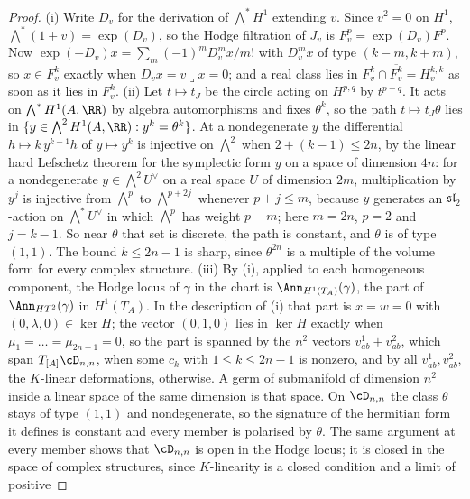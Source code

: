\begin{proof}
(i) Write $D_{v}$ for the derivation of $\bigwedge^{*}H^{1}$ extending $v$.
Since $v^{2}=0$ on $H^{1}$, $\bigwedge^{*}(1+v)=\exp(D_{v})$, so the Hodge
filtration of $J_{v}$ is $F^{p}_{v}=\exp(D_{v})F^{p}$. Now
$\exp(-D_{v})x=\sum_{m}(-1)^{m}D_{v}^{m}x/m!$ with $D_{v}^{m}x$ of type
$(k-m,k+m)$, so $x\in F^{k}_{v}$ exactly when $D_{v}x=v\lrcorner x=0$; and a
real class lies in $F^{k}_{v}\cap\overline{F^{k}_{v}}=H^{k,k}_{v}$ as soon as
it lies in $F^{k}_{v}$. (ii) Let $t\mapsto t_{J}$ be the circle acting on
$H^{p,q}$ by $t^{p-q}$. It acts on $\bigwedge^{*}H^{1}(A,\RR)$ by algebra
automorphisms and fixes $\theta^{k}$, so the path $t\mapsto t_{J}\theta$ lies in
$\{y\in\bigwedge^{2}H^{1}(A,\RR):y^{k}=\theta^{k}\}$. At a nondegenerate $y$
the differential $h\mapsto k\,y^{k-1}h$ of $y\mapsto y^{k}$ is injective on
$\bigwedge^{2}$ when $2+(k-1)\le2n$, by the linear hard Lefschetz theorem for
the symplectic form $y$ on a space of dimension $4n$: for a nondegenerate
$y\in\bigwedge^{2}U^{\vee}$ on a real space $U$ of dimension $2m$,
multiplication by $y^{j}$ is injective from $\bigwedge^{p}$ to
$\bigwedge^{p+2j}$ whenever $p+j\le m$, because $y$ generates an
$\mathfrak{sl}_{2}$-action on $\bigwedge^{*}U^{\vee}$ in which $\bigwedge^{p}$
has weight $p-m$; here $m=2n$, $p=2$ and $j=k-1$. So near $\theta$ that set
is discrete, the path is constant, and $\theta$ is of type $(1,1)$. The bound
$k\le2n-1$ is sharp, since $\theta^{2n}$ is a multiple of the volume form for
every complex structure. (iii) By
(i), applied to each homogeneous component, the Hodge locus of $\gamma$ in the
chart is $\Ann_{H^{1}(T_{A})}(\gamma)$, the part of $\Ann_{HT^{2}}(\gamma)$ in
$H^{1}(T_{A})$. In the description of (i) that part is
$x=w=0$ with $(0,\lambda,0)\in\ker H$; the vector $(0,1,0)$ lies in $\ker H$
exactly when $\mu_{1}=\dots=\mu_{2n-1}=0$, so the part is spanned by the $n^{2}$
vectors $v^{1}_{ab}+v^{2}_{ab}$, which span $T_{[A]}\cD_{n,n}$, when some
$c_{k}$ with $1\le k\le2n-1$ is nonzero, and by all $v^{1}_{ab},v^{2}_{ab}$,
the $K$-linear deformations, otherwise. A germ of submanifold of dimension
$n^{2}$ inside a linear space of the same dimension is that space. On
$\cD_{n,n}$ the class $\theta$ stays of type $(1,1)$ and nondegenerate, so the
signature of the hermitian form it defines is constant and every member is
polarised by $\theta$. The same argument at every member shows that
$\cD_{n,n}$ is open in the Hodge locus; it is closed in the space of complex
structures, since $K$-linearity is a closed condition and a limit of positive

\end{proof}
